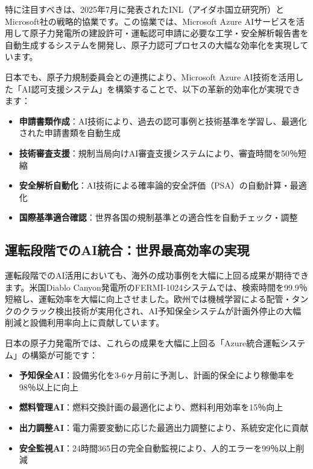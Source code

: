 \documentclass[10pt,a4paper]{jsarticle}
\begin{document}
特に注目すべきは、2025年7月に発表されたINL（アイダホ国立研究所）とMicrosoft社の戦略的協業です\cite{inl2025}。この協業では、Microsoft Azure AIサービスを活用して原子力発電所の建設許可・運転認可申請に必要な工学・安全解析報告書を自動生成するシステムを開発し、原子力認可プロセスの大幅な効率化を実現しています。

日本でも、原子力規制委員会との連携により、Microsoft Azure AI技術を活用した「AI認可支援システム」を構築することで、以下の革新的効率化が実現できます：

\begin{itemize}
    \item \textbf{申請書類作成}：AI技術により、過去の認可事例と技術基準を学習し、最適化された申請書類を自動生成
    \item \textbf{技術審査支援}：規制当局向けAI審査支援システムにより、審査時間を50％短縮
    \item \textbf{安全解析自動化}：AI技術による確率論的安全評価（PSA）の自動計算・最適化
    \item \textbf{国際基準適合確認}：世界各国の規制基準との適合性を自動チェック・調整
\end{itemize}

\subsection{運転段階でのAI統合：世界最高効率の実現}

運転段階でのAI活用においても、海外の成功事例を大幅に上回る成果が期待できます。米国Diablo Canyon発電所のFERMI-1024システムでは、検索時間を99.9％短縮し、運転効率を大幅に向上させました\cite{fermi2024}。欧州では機械学習による配管・タンクのクラック検出技術が実用化され、AI予知保全システムが計画外停止の大幅削減と設備利用率向上に貢献しています\cite{iaea2024}。

日本の原子力発電所では、これらの成果を大幅に上回る「Azure統合運転システム」の構築が可能です：

\begin{itemize}
    \item \textbf{予知保全AI}：設備劣化を3-6ヶ月前に予測し、計画的保全により稼働率を98％以上に向上
    \item \textbf{燃料管理AI}：燃料交換計画の最適化により、燃料利用効率を15％向上
    \item \textbf{出力調整AI}：電力需要変動に応じた最適出力調整により、系統安定化に貢献
    \item \textbf{安全監視AI}：24時間365日の完全自動監視により、人的エラーを99％以上削減
\end{itemize}
\end{document}
